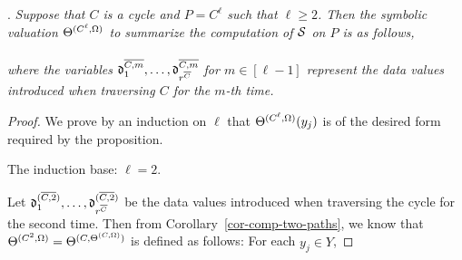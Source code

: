 \begin{appendix}
.
{\it 
Suppose that $C$ is a cycle and $P=C^{\ell}$ such that $\ell \ge 2$. Then the symbolic valuation $\Theta^{(C^\ell,\Omega)}$ to summarize the computation of ${\mathcal{S} }$ on $P$ is as follows,\medskip\\
\medskip\\
where the variables $\mathfrak{d}^{\overline{C , m}}_{1},\dots, \mathfrak{d}^{\overline{C , m}}_{r^{\overline{C}}}$ for $m\in [\ell-1]$
 represent the data values introduced when traversing $C$ for the $m$-th time.
}

%
\begin{proof}
We prove by an induction on $\ell$ that $\Theta^{(C^\ell,\Omega)}(y_j)$ is of the desired form required by the proposition.

\noindent The induction base: $\ell=2$.

\smallskip

Let $\mathfrak{d}^{(\overline{C, 2})}_{1}, \dots, \mathfrak{d}^{(\overline{C, 2})}_{r^{\overline{C}}}$ be the data values introduced when traversing the cycle for the second time. Then from Corollary~\ref{cor-comp-two-paths}, we know that $\Theta^{(C^{2},\Omega)} = \Theta^{(C,\Theta^{(C,\Omega)})}$ is defined as follows: For each $y_j \in Y$,


\end{proof}
\end{appendix}
